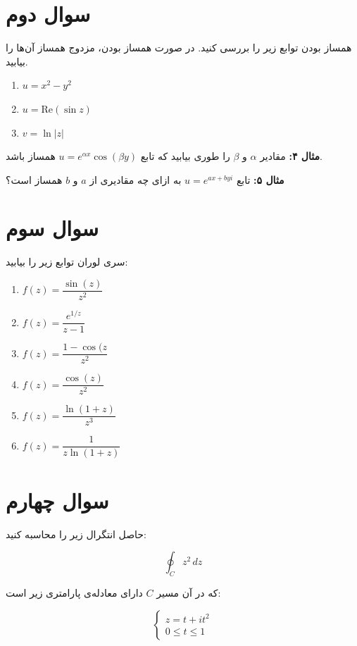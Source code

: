 \documentclass[a4paper,16pt]{article}
\begin{document}
	\section{سوال دوم}
	همساز بودن توابع زیر را بررسی کنید.  
	در صورت همساز بودن، مزدوج همساز آن‌ها را بیابید.
	
	\begin{enumerate}
		\item \( u = x^2 - y^2 \)
		\item \( u = \mathrm{Re}(\sin z) \)
		\item \( v = \ln|z| \)
	\end{enumerate}
	
	\textbf{مثال ۴:}  
	مقادیر \(\alpha\) و \(\beta\) را طوری بیابید که تابع  
	\( u = e^{\alpha x} \cos(\beta y) \)  
	همساز باشد.
	
	\vspace{8pt}
	\textbf{مثال ۵:}  
	 تابع  
	\( u = e^{a x+byi} \)  
	به ازای چه مقادیری از \( a \) و \( b \) همساز است؟
	
	\section{سوال سوم}
	سری لوران توابع زیر را بیابید:
	
	\begin{enumerate}
		\item \( f(z) = \dfrac{\sin(z)}{z^2} \)
		\item \( f(z) = \dfrac{e^{1/z}}{z - 1} \)
		\item \( f(z) = \dfrac{1 - \cos(z}{z^2} \)
		\item \( f(z) = \dfrac{\cos(z)}{z^2} \)
		\item \( f(z) = \dfrac{\ln(1+z)}{z^3} \)
		\item \( f(z) = \dfrac{1}{z\ln (1+z)} \)
		
	\end{enumerate}
	\section{سوال چهارم}
	
	حاصل انتگرال زیر را محاسبه کنید:
	
	\[
	\oint_{C} z^2 \, dz
	\]
	
	که در آن مسیر \( C \) دارای معادله‌ی پارامتری زیر است:
	
	\[
	\begin{cases}
		z = t + i t^2 \\
		0 \le t \le 1
	\end{cases}
	\]
\end{document}

